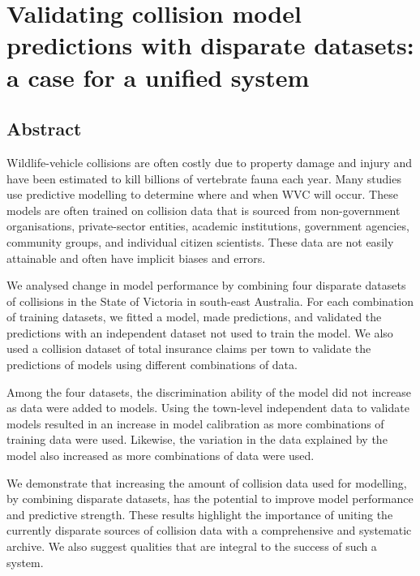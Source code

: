 \chapter{Validating collision model predictions with disparate datasets: a case for a unified system}\label{sec:val}
\newpage

\begin{localsize}{11}
\section*{\centering Abstract}

Wildlife-vehicle collisions are often costly due to property damage and injury and have been estimated to kill billions of vertebrate fauna each year. Many studies use predictive modelling to determine where and when WVC will occur. These models are often trained on collision data that is sourced from non-government organisations, private-sector entities, academic institutions, government agencies, community groups, and individual citizen scientists. These data are not easily attainable and often have implicit biases and errors.

We analysed change in model performance by combining four disparate datasets of collisions in the State of Victoria in south-east Australia. For each combination of training datasets, we fitted a model, made predictions, and validated the predictions with an independent dataset not used to train the model. We also used a collision dataset of total insurance claims per town to validate the predictions of models using different combinations of data. 

Among the four datasets, the discrimination ability of the model did not increase as data were added to models. Using the town-level independent data to validate models resulted in an increase in model calibration as more combinations of training data were used. Likewise, the variation in the data explained by the model also increased as more combinations of data were used.

We demonstrate that increasing the amount of collision data used for modelling, by combining disparate datasets, has the potential to improve model performance and predictive strength. These results highlight the importance of uniting the currently disparate sources of collision data with a comprehensive and systematic archive. We also suggest qualities that are integral to the success of such a system.
\end{localsize}

